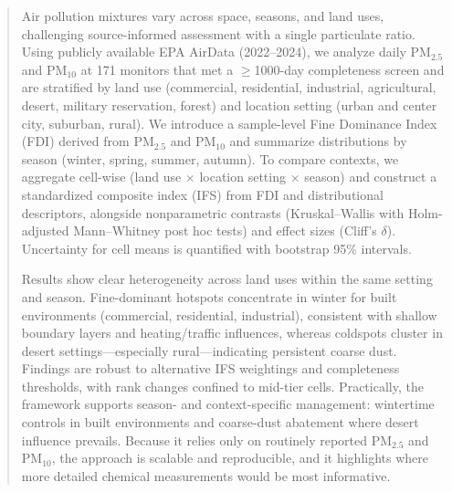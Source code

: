 \documentclass[a4paper,fleqn]{cas-sc}
\begin{document}


\begin{abstract}
Air pollution mixtures vary across space, seasons, and land uses, challenging source-informed assessment with a single particulate ratio. Using publicly available EPA AirData (2022–2024), we analyze daily PM$_{2.5}$ and PM$_{10}$ at 171 monitors that met a $\ge$1000-day completeness screen and are stratified by land use (commercial, residential, industrial, agricultural, desert, military reservation, forest) and location setting (urban and center city, suburban, rural). We introduce a sample-level Fine Dominance Index (FDI) derived from PM$_{2.5}$ and PM$_{10}$ and summarize distributions by season (winter, spring, summer, autumn). To compare contexts, we aggregate cell-wise (land use $\times$ location setting $\times$ season) and construct a standardized composite index (IFS) from FDI and distributional descriptors, alongside nonparametric contrasts (Kruskal--Wallis with Holm-adjusted Mann--Whitney post hoc tests) and effect sizes (Cliff’s $\delta$). Uncertainty for cell means is quantified with bootstrap 95\% intervals.

Results show clear heterogeneity across land uses within the same setting and season. Fine-dominant hotspots concentrate in winter for built environments (commercial, residential, industrial), consistent with shallow boundary layers and heating/traffic influences, whereas coldspots cluster in desert settings---especially rural---indicating persistent coarse dust. Findings are robust to alternative IFS weightings and completeness thresholds, with rank changes confined to mid-tier cells. Practically, the framework supports season- and context-specific management: wintertime controls in built environments and coarse-dust abatement where desert influence prevails. Because it relies only on routinely reported PM$_{2.5}$ and PM$_{10}$, the approach is scalable and reproducible, and it highlights where more detailed chemical measurements would be most informative.
\end{abstract}
\end{document}
